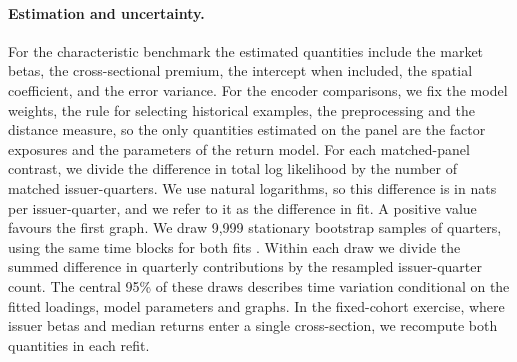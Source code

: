 \paragraph{Estimation and uncertainty.}
For the characteristic benchmark the estimated quantities include the
market betas, the cross-sectional premium, the intercept when
included, the spatial coefficient, and the error variance. For the
encoder comparisons, we fix the model weights, the rule for
selecting historical examples, the preprocessing and the distance measure,
so the only quantities estimated on the panel are the factor exposures and
the parameters of the return model.
For each matched-panel contrast, we divide the difference in total log
likelihood by the number of matched issuer-quarters. We use natural
logarithms, so this difference is in nats per issuer-quarter, and we
refer to it as the difference in fit. A positive value favours the first
graph. We draw 9,999 stationary bootstrap samples of
quarters, using the same time blocks for both fits \citep{politis1994}.
Within each draw we divide the summed difference in quarterly
contributions by the resampled issuer-quarter count. The central 95\%
of these draws describes time variation conditional on the fitted
loadings, model parameters and graphs. In the fixed-cohort exercise,
where issuer betas and median returns
enter a single cross-section, we recompute both quantities in each refit.
